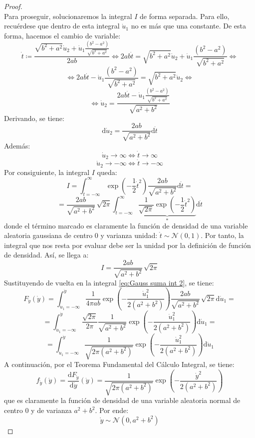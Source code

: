 \documentclass[11pt,a4paper,spanish]{article}
\numberwithin{equation}{section}
\numberwithin{table}{section}
\numberwithin{figure}{section}
\theoremstyle{definition}
\theoremstyle{remark}
\theoremstyle{definition}
\theoremstyle{remark}
\theoremstyle{plain}
\theoremstyle{plain}
\theoremstyle{plain}
\theoremstyle{plain}
\theoremstyle{plain}
\theoremstyle{plain}
\begin{document}
\begin{proof}
\begin{equation}
		\end{equation}
		Para proseguir, solucionaremos la integral $I$ de forma separada.
		Para ello, recuérdese que dentro de esta integral $\dot{u}_{1}$ no
		es más que una constante. De esta forma, hacemos el cambio de variable:
		\[
		\dot{t}\coloneqq\frac{\sqrt{b^{2}+a^{2}}\dot{u}_{2}+\dot{u}_{1}\frac{\left(b^{2}-a^{2}\right)}{\sqrt{b^{2}+a^{2}}}}{2ab}\iff2ab\dot{t}=\sqrt{b^{2}+a^{2}}\dot{u}_{2}+\dot{u}_{1}\frac{\left(b^{2}-a^{2}\right)}{\sqrt{b^{2}+a^{2}}}\iff
		\]
		\[
		\iff2ab\dot{t}-\dot{u}_{1}\frac{\left(b^{2}-a^{2}\right)}{\sqrt{b^{2}+a^{2}}}=\sqrt{b^{2}+a^{2}}\dot{u}_{2}\iff
		\]
		\[
		\iff\dot{u}_{2}=\frac{2ab\dot{t}-\dot{u}_{1}\frac{\left(b^{2}-a^{2}\right)}{\sqrt{b^{2}+a^{2}}}}{\sqrt{a^{2}+b^{2}}}
		\]
		Derivando, se tiene:
		\[
		\mathrm{d}\dot{u}_{2}=\frac{2ab}{\sqrt{a^{2}+b^{2}}}\mathrm{d}\dot{t}
		\]
		Además:
		\[
		\dot{u}_{2}\to\infty\iff\dot{t}\to\infty
		\]
		\[
		\dot{u}_{2}\to-\infty\iff\dot{t}\to-\infty
		\]
		Por consiguiente, la integral $I$ queda:
		\[
		I=\int_{\dot{t}=-\infty}^{\infty}\exp\left(-\frac{1}{2}\dot{t}^{2}\right)\frac{2ab}{\sqrt{a^{2}+b^{2}}}\mathrm{d}\dot{t}=
		\]
		\[
		=\frac{2ab}{\sqrt{a^{2}+b^{2}}}\,\sqrt{2\pi}\int_{\dot{t}=-\infty}^{\infty}\underbrace{\frac{1}{\sqrt{2\pi}}\exp\left(-\frac{1}{2}\dot{t}^{2}\right)}_{*}\mathrm{d}\dot{t}
		\]
		donde el término marcado es claramente la función de densidad de una
		variable aleatoria gaussiana de centro $0$ y varianza unidad: $\mathring{t}\sim\mathcal{N}\left(0,1\right)$.
		Por tanto, la integral que nos resta por evaluar debe ser la unidad
		por la definición de función de densidad. Así, se llega a:
		\[
		I=\frac{2ab}{\sqrt{a^{2}+b^{2}}}\,\sqrt{2\pi}
		\]
		Sustituyendo de vuelta en la integral \vref{eq:Gauss suma int 2},
		se tiene:
		\[
		F_{\mathring{y}}\left(\dot{y}\right)=\int_{\dot{u}_{1}=-\infty}^{\dot{y}}\frac{1}{4\pi ab}\exp\left(-\frac{\dot{u}_{1}^{2}}{2\left(a^{2}+b^{2}\right)}\right)\frac{2ab}{\sqrt{a^{2}+b^{2}}}\,\sqrt{2\pi}\mathrm{d}\dot{u}_{1}=
		\]
		\[
		=\int_{\dot{u}_{1}=-\infty}^{\dot{y}}\frac{\sqrt{2\pi}}{2\pi}\frac{1}{\sqrt{a^{2}+b^{2}}}\exp\left(-\frac{\dot{u}_{1}^{2}}{2\left(a^{2}+b^{2}\right)}\right)\mathrm{d}\dot{u}_{1}=
		\]
		\[
		=\int_{\dot{u}_{1}=-\infty}^{\dot{y}}\frac{1}{\sqrt{2\pi\left(a^{2}+b^{2}\right)}}\exp\left(-\frac{\dot{u}_{1}^{2}}{2\left(a^{2}+b^{2}\right)}\right)\mathrm{d}\dot{u}_{1}
		\]
		A continuación, por el Teorema Fundamental del Cálculo Integral, se
		tiene:
		\[
		f_{\mathring{y}}\left(\dot{y}\right)=\frac{\mathrm{d}F_{\mathring{y}}}{\mathrm{d}\dot{y}}\left(\dot{y}\right)=\frac{1}{\sqrt{2\pi\left(a^{2}+b^{2}\right)}}\exp\left(-\frac{\dot{y}^{2}}{2\left(a^{2}+b^{2}\right)}\right)
		\]
		que es claramente la función de densidad de una variable aleatoria
		normal de centro $0$ y de varianza $a^{2}+b^{2}$. Por ende:
		\[
		\mathring{y}\sim\mathcal{N}\left(0,a^{2}+b^{2}\right)
		\]
	\end{proof}
\end{document}
